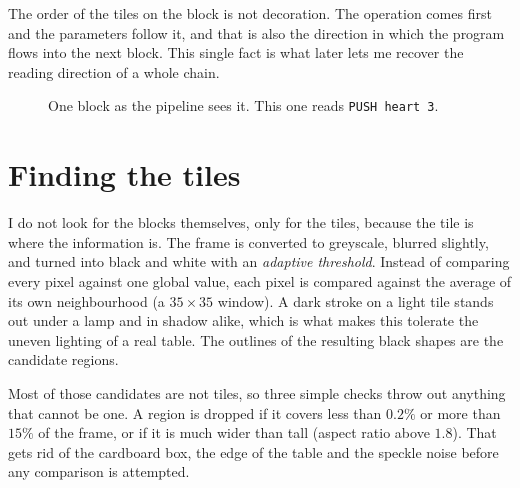\documentclass[11pt,a4paper]{article}
\newcommand{\code}[1]{\texttt{#1}}
\begin{document}
The order of the tiles on the block is not decoration. The operation comes first and the parameters follow it, and that is also the direction in which the program flows into the next block. This single fact is what later lets me recover the reading direction of a whole chain.

\begin{figure}[h]
\centering
{}
\caption{One block as the pipeline sees it. This one reads \code{PUSH heart 3}.}
\label{fig:block}
\end{figure}

\section{Finding the tiles}

I do not look for the blocks themselves, only for the tiles, because the tile is where the information is. The frame is converted to greyscale, blurred slightly, and turned into black and white with an \emph{adaptive threshold}. Instead of comparing every pixel against one global value, each pixel is compared against the average of its own neighbourhood (a $35\times35$ window). A dark stroke on a light tile stands out under a lamp and in shadow alike, which is what makes this tolerate the uneven lighting of a real table. The outlines of the resulting black shapes are the candidate regions.

Most of those candidates are not tiles, so three simple checks throw out anything that cannot be one. A region is dropped if it covers less than $0.2\%$ or more than $15\%$ of the frame, or if it is much wider than tall (aspect ratio above $1.8$). That gets rid of the cardboard box, the edge of the table and the speckle noise before any comparison is attempted.
\end{document}
